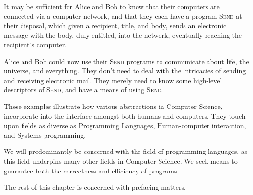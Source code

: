 \begin{example} \label{example:alice-bob-email} \

It may be sufficient for Alice and Bob to know that their computers are
connected via a computer network, and that they each have a program
\textsc{Send} at their disposal, which given a recipient, title, and body,
sends an electronic message with the body, duly entitled, into the network,
eventually reaching the recipient's computer.

Alice and Bob could now use their \textsc{Send} programs to communicate about
life, the universe, and everything. They don't need to deal with the
intricacies of sending and receiving electronic mail. They merely need to know
some high-level descriptors of \textsc{Send}, and have a means of using
\textsc{Send}.

\end{example}

These examples illustrate how various abstractions in Computer Science,
incorporate into the interface amongst both humans and computers. They touch
upon fields as diverse as Programming Languages, Human-computer interaction,
and Systems programming.

We will predominantly be concerned with the field of programming languages, as
this field underpins many other fields in Computer Science. We seek means to
guarantee both the correctness and efficiency of programs.




The rest of this chapter is concerned with prefacing matters.
